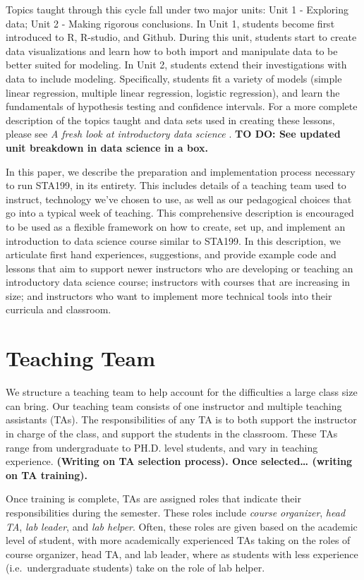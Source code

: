 \documentclass[
  12pt]{article}
\begin{document}
Topics taught through this cycle fall under two major units: Unit 1 -
Exploring data; Unit 2 - Making rigorous conclusions. In Unit 1,
students become first introduced to R, R-studio, and Github. During this
unit, students start to create data visualizations and learn how to both
import and manipulate data to be better suited for modeling. In Unit 2,
students extend their investigations with data to include modeling.
Specifically, students fit a variety of models (simple linear
regression, multiple linear regression, logistic regression), and learn
the fundamentals of hypothesis testing and confidence intervals. For a
more complete description of the topics taught and data sets used in
creating these lessons, please see \emph{A fresh look at introductory
data science} \citep{Cetinkaya2020}. \textbf{TO DO: See updated unit
breakdown in data science in a box.}

In this paper, we describe the preparation and implementation process
necessary to run STA199, in its entirety. This includes details of a
teaching team used to instruct, technology we've chosen to use, as well
as our pedagogical choices that go into a typical week of teaching. This
comprehensive description is encouraged to be used as a flexible
framework on how to create, set up, and implement an introduction to
data science course similar to STA199. In this description, we
articulate first hand experiences, suggestions, and provide example code
and lessons that aim to support newer instructors who are developing or
teaching an introductory data science course; instructors with courses
that are increasing in size; and instructors who want to implement more
technical tools into their curricula and classroom.

\hypertarget{teaching-team}{%
\section{Teaching Team}\label{teaching-team}}

We structure a teaching team to help account for the difficulties a
large class size can bring. Our teaching team consists of one instructor
and multiple teaching assistants (TAs). The responsibilities of any TA
is to both support the instructor in charge of the class, and support
the students in the classroom. These TAs range from undergraduate to
PH.D. level students, and vary in teaching experience. \textbf{(Writing
on TA selection process). Once selected\ldots{} (writing on TA
training).}

Once training is complete, TAs are assigned roles that indicate their
responsibilities during the semester. These roles include \emph{course
organizer}, \emph{head TA}, \emph{lab leader}, and \emph{lab helper}.
Often, these roles are given based on the academic level of student,
with more academically experienced TAs taking on the roles of course
organizer, head TA, and lab leader, where as students with less
experience (i.e.~undergraduate students) take on the role of lab helper.
\end{document}
